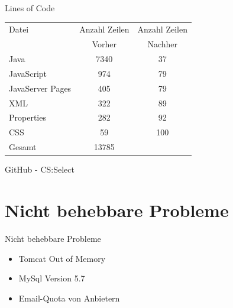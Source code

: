 \documentclass[xcolor=dvipsnames]{beamer}
\begin{document}
    \begin{frame}{Lines of Code}
        \begin{table}[t]
            \begin{center}
                \begin{tabular}{ | l | c | c | }
                    \hline
                    Datei & Anzahl Zeilen & Anzahl Zeilen \\
                    & Vorher & Nachher \\ \hline
                    Java & 7340 & 37 \\
                    JavaScript & 974 & 79 \\
                    JavaServer Pages & 405 & 79 \\
                    XML & 322 & 89 \\
                    Properties & 282 & 92 \\
                    CSS & 59 & 100 \\ \Xhline{0.8pt}
                    Gesamt & 13785 &  \\ \hline
                \end{tabular}
            \end{center}
        \end{table}
    \end{frame}


    \begin{frame}{GitHub - CS:Select}
        \begin{itemize}
            \vspace{10pt}
        \end{itemize}
    \end{frame}

    \section{Nicht behebbare Probleme}
    \begin{frame}{Nicht behebbare Probleme}
        \begin{itemize}
            \item Tomcat Out of Memory
            \item MySql Version 5.7
            \item Email-Quota von Anbietern
        \end{itemize}
    \end{frame}
\end{document}
